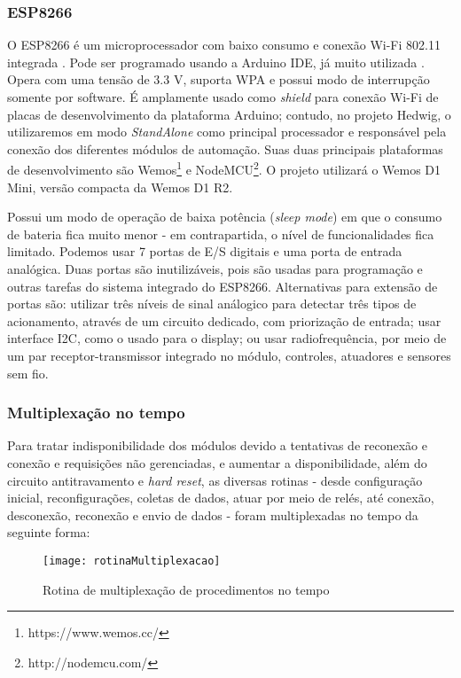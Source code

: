 \subsubsection{ESP8266}
O ESP8266 é um microprocessador com baixo consumo e conexão Wi-Fi 802.11 integrada \cite{espressif}. Pode ser programado usando a Arduino IDE, já muito utilizada \cite{thomsen}. Opera com uma tensão de 3.3 V, suporta WPA e possui modo de interrupção somente por software. É amplamente usado como \textit{shield} para conexão Wi-Fi de placas de desenvolvimento da plataforma Arduino; contudo, no projeto Hedwig, o utilizaremos em modo \textit{StandAlone} como principal processador e responsável pela conexão dos diferentes módulos de automação. Suas duas principais plataformas de desenvolvimento são Wemos\footnote{https://www.wemos.cc/} e NodeMCU\footnote{http://nodemcu.com/}. O projeto utilizará o Wemos D1 Mini, versão compacta da Wemos D1 R2.

Possui um modo de operação de baixa potência (\textit{sleep mode}) em que o consumo de bateria fica muito menor - em contrapartida, o nível de funcionalidades fica limitado. Podemos usar 7 portas de E/S digitais e uma porta de entrada analógica. Duas portas são inutilizáveis, pois são usadas para programação e outras tarefas do sistema integrado do ESP8266. Alternativas para extensão de portas são: utilizar três níveis de sinal análogico para detectar três tipos de acionamento, através de um circuito dedicado, com priorização de entrada; usar interface I2C, como o usado para o display; ou usar radiofrequência, por meio de um par receptor-transmissor integrado no módulo, controles, atuadores e sensores sem fio.

\subsubsection{Multiplexação no tempo}
Para tratar indisponibilidade dos módulos devido a tentativas de reconexão e conexão e requisições não gerenciadas, e aumentar a disponibilidade, além do circuito antitravamento e \textit{hard reset}, as diversas rotinas - desde configuração inicial, reconfigurações, coletas de dados, atuar por meio de relés, até conexão, desconexão, reconexão e envio de dados - foram multiplexadas no tempo da seguinte forma:

\begin{figure}[H]
	\centering
	\caption{Rotina de multiplexação de procedimentos no tempo}
  \texttt{[image: rotinaMultiplexacao]}
\label{fig:rotinaMultiplexacao}
\end{figure}

